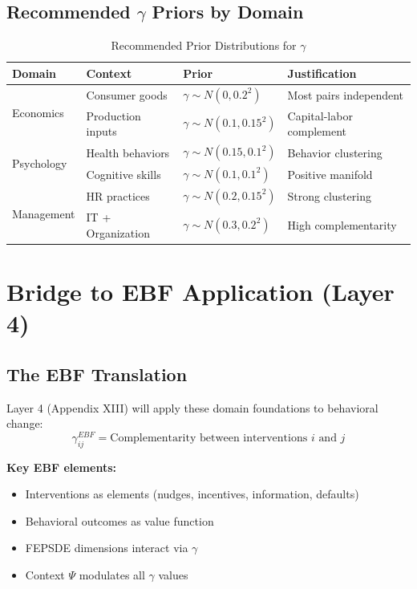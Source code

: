 \subsection{Recommended $\gamma$ Priors by Domain}

\begin{table}[h]
\centering
\caption{Recommended Prior Distributions for $\gamma$}
\label{tab:priors}
\renewcommand{\arraystretch}{1.3}
\begin{tabular}{@{}llll@{}}
\toprule
\textbf{Domain} & \textbf{Context} & \textbf{Prior} & \textbf{Justification} \\
\midrule
\multirow{2}{*}{Economics} & Consumer goods & $\gamma \sim N(0, 0.2^2)$ & Most pairs independent \\
 & Production inputs & $\gamma \sim N(0.1, 0.15^2)$ & Capital-labor complement \\
\multirow{2}{*}{Psychology} & Health behaviors & $\gamma \sim N(0.15, 0.1^2)$ & Behavior clustering \\
 & Cognitive skills & $\gamma \sim N(0.1, 0.1^2)$ & Positive manifold \\
\multirow{2}{*}{Management} & HR practices & $\gamma \sim N(0.2, 0.15^2)$ & Strong clustering \\
 & IT + Organization & $\gamma \sim N(0.3, 0.2^2)$ & High complementarity \\
\bottomrule
\end{tabular}
\end{table}

\section{Bridge to EBF Application (Layer 4)}
\label{sec:bridge}

\subsection{The EBF Translation}

\begin{tcolorbox}[colback=red!5!white,colframe=red!75!black,title=\textbf{From Domain Foundations to EBF}]
Layer 4 (Appendix XIII) will apply these domain foundations to behavioral change:
\begin{equation}
\gamma^{EBF}_{ij} = \text{Complementarity between interventions } i \text{ and } j
\end{equation}

\textbf{Key EBF elements:}
\begin{itemize}[noitemsep]
    \item Interventions as elements (nudges, incentives, information, defaults)
    \item Behavioral outcomes as value function
    \item FEPSDE dimensions interact via $\gamma$
    \item Context $\Psi$ modulates all $\gamma$ values
\end{itemize}
\end{tcolorbox}

